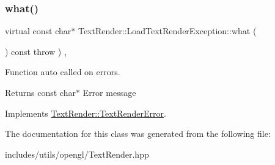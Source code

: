 \subsubsection{\texorpdfstring{what()}{what()}}
{\footnotesize\ttfamily virtual const char$\ast$ Text\+Render\+::\+Load\+Text\+Render\+Exception\+::what (\begin{DoxyParamCaption}{ }\end{DoxyParamCaption}) const throw  ) \hspace{0.3cm}{\ttfamily [inline]}, {\ttfamily [virtual]}}



Function auto called on errors. 

\begin{DoxyReturn}{Returns}
const char$\ast$ Error message 
\end{DoxyReturn}


Implements \hyperlink{class_text_render_1_1_text_render_error_abb3d61a36ca4e1dbc0e4b4412a06cb68}{Text\+Render\+::\+Text\+Render\+Error}.



The documentation for this class was generated from the following file\+:\begin{DoxyCompactItemize}
\item 
includes/utils/opengl/Text\+Render.\+hpp\end{DoxyCompactItemize}
